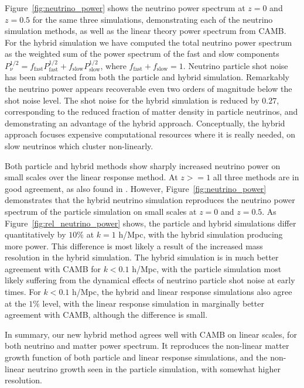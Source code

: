\documentclass[useAMS, usenatbib]{mnras}
\begin{document}
Figure~\ref{fig:neutrino_power} shows the neutrino power spectrum at $z=0$ and $z=0.5$ for the same three simulations, demonstrating each of the neutrino simulation methods, as well as the linear theory power spectrum from CAMB. For the hybrid simulation we have computed the total neutrino power spectrum as the weighted sum of the power spectrum of the fast and slow components $P^{1/2}_\nu = f_\mathrm{fast} P^{1/2}_\mathrm{fast} + f_\mathrm{slow} P^{1/2}_\mathrm{slow}$, where $f_\mathrm{fast} + f_\mathrm{slow} = 1$.
Neutrino particle shot noise has been subtracted from both the particle and hybrid simulation. Remarkably the neutrino power appears recoverable even two orders of magnitude below the shot noise level. The shot noise for the hybrid simulation is reduced by $0.27$, corresponding to the reduced fraction of matter density in particle neutrinos, and demonstrating an advantage of the hybrid approach. Conceptually, the hybrid approach focuses expensive computational resources where it is really needed, on slow neutrinos which cluster non-linearly.

Both particle and hybrid methods show sharply increased neutrino power on small scales over the linear response method. At $z >= 1$ all three methods are in good agreement, as also found in \cite{AHB}. However, Figure~\ref{fig:neutrino_power} demonstrates that the hybrid neutrino simulation reproduces the neutrino power spectrum of the particle simulation on small scales at $z = 0$ and $z=0.5$. As Figure~\ref{fig:rel_neutrino_power} shows, the particle and hybrid simulations differ quantitatively by $10\%$ at $k=1$ h/Mpc, with the hybrid simulation producing more power. This difference is most likely a result of the increased mass resolution in the hybrid simulation. The hybrid simulation is in much better agreement with CAMB for $k < 0.1$ h/Mpc, with the particle simulation most likely suffering from the dynamical effects of neutrino particle shot noise at early times. For $k < 0.1$ h/Mpc, the hybrid and linear response simulations also agree at the $1\%$ level, with the linear response simulation in marginally better agreement with CAMB, although the difference is small. 

In summary, our new hybrid method agrees well with CAMB on linear scales, for both neutrino and matter power spectrum. It reproduces the non-linear matter growth function of both particle and linear response simulations, and the non-linear neutrino growth seen in the particle simulation, with somewhat higher resolution.
\end{document}
